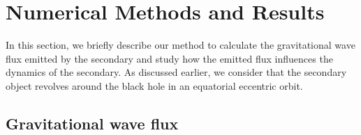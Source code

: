 \documentclass[11pt]{article}
\begin{document}

\section{Numerical Methods and Results}\label{nmr}
In this section, we briefly describe our method to calculate the gravitational wave flux emitted by the secondary and study how the emitted flux influences the dynamics of the secondary. As discussed earlier, we consider that the secondary object revolves around the black hole in an equatorial eccentric orbit. 
\subsection{Gravitational wave flux}
\end{document}
